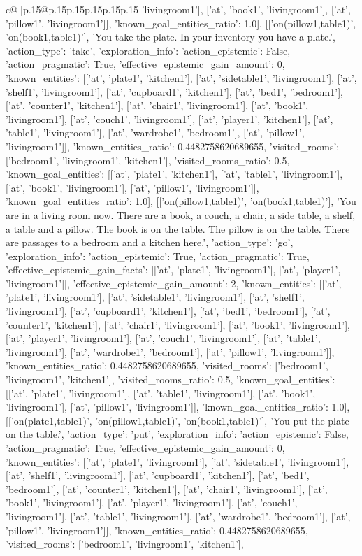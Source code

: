 \documentclass{article}
\begin{document}
{\begin{supertabular}{c@{$\;$}|p{.15\linewidth}@{}p{.15\linewidth}p{.15\linewidth}p{.15\linewidth}p{.15\linewidth}p{.15\linewidth}}
{{{'livingroom1'], ['at', 'book1', 'livingroom1'], ['at', 'pillow1', 'livingroom1']], 'known_goal_entities_ratio': 1.0}}], [['on(pillow1,table1)', 'on(book1,table1)'], 'You take the plate. In your inventory you have a plate.', {'action_type': 'take', 'exploration_info': {'action_epistemic': False, 'action_pragmatic': True, 'effective_epistemic_gain_amount': 0, 'known_entities': [['at', 'plate1', 'kitchen1'], ['at', 'sidetable1', 'livingroom1'], ['at', 'shelf1', 'livingroom1'], ['at', 'cupboard1', 'kitchen1'], ['at', 'bed1', 'bedroom1'], ['at', 'counter1', 'kitchen1'], ['at', 'chair1', 'livingroom1'], ['at', 'book1', 'livingroom1'], ['at', 'couch1', 'livingroom1'], ['at', 'player1', 'kitchen1'], ['at', 'table1', 'livingroom1'], ['at', 'wardrobe1', 'bedroom1'], ['at', 'pillow1', 'livingroom1']], 'known_entities_ratio': 0.4482758620689655, 'visited_rooms': ['bedroom1', 'livingroom1', 'kitchen1'], 'visited_rooms_ratio': 0.5, 'known_goal_entities': [['at', 'plate1', 'kitchen1'], ['at', 'table1', 'livingroom1'], ['at', 'book1', 'livingroom1'], ['at', 'pillow1', 'livingroom1']], 'known_goal_entities_ratio': 1.0}}], [['on(pillow1,table1)', 'on(book1,table1)'], 'You are in a living room now. There are a book, a couch, a chair, a side table, a shelf, a table and a pillow. The book is on the table. The pillow is on the table. There are passages to a bedroom and a kitchen here.', {'action_type': 'go', 'exploration_info': {'action_epistemic': True, 'action_pragmatic': True, 'effective_epistemic_gain_facts': [['at', 'plate1', 'livingroom1'], ['at', 'player1', 'livingroom1']], 'effective_epistemic_gain_amount': 2, 'known_entities': [['at', 'plate1', 'livingroom1'], ['at', 'sidetable1', 'livingroom1'], ['at', 'shelf1', 'livingroom1'], ['at', 'cupboard1', 'kitchen1'], ['at', 'bed1', 'bedroom1'], ['at', 'counter1', 'kitchen1'], ['at', 'chair1', 'livingroom1'], ['at', 'book1', 'livingroom1'], ['at', 'player1', 'livingroom1'], ['at', 'couch1', 'livingroom1'], ['at', 'table1', 'livingroom1'], ['at', 'wardrobe1', 'bedroom1'], ['at', 'pillow1', 'livingroom1']], 'known_entities_ratio': 0.4482758620689655, 'visited_rooms': ['bedroom1', 'livingroom1', 'kitchen1'], 'visited_rooms_ratio': 0.5, 'known_goal_entities': [['at', 'plate1', 'livingroom1'], ['at', 'table1', 'livingroom1'], ['at', 'book1', 'livingroom1'], ['at', 'pillow1', 'livingroom1']], 'known_goal_entities_ratio': 1.0}}], [['on(plate1,table1)', 'on(pillow1,table1)', 'on(book1,table1)'], 'You put the plate on the table.', {'action_type': 'put', 'exploration_info': {'action_epistemic': False, 'action_pragmatic': True, 'effective_epistemic_gain_amount': 0, 'known_entities': [['at', 'plate1', 'livingroom1'], ['at', 'sidetable1', 'livingroom1'], ['at', 'shelf1', 'livingroom1'], ['at', 'cupboard1', 'kitchen1'], ['at', 'bed1', 'bedroom1'], ['at', 'counter1', 'kitchen1'], ['at', 'chair1', 'livingroom1'], ['at', 'book1', 'livingroom1'], ['at', 'player1', 'livingroom1'], ['at', 'couch1', 'livingroom1'], ['at', 'table1', 'livingroom1'], ['at', 'wardrobe1', 'bedroom1'], ['at', 'pillow1', 'livingroom1']], 'known_entities_ratio': 0.4482758620689655, 'visited_rooms': ['bedroom1', 'livingroom1', 'kitchen1'], }}}
\end{supertabular}}
\end{document}
